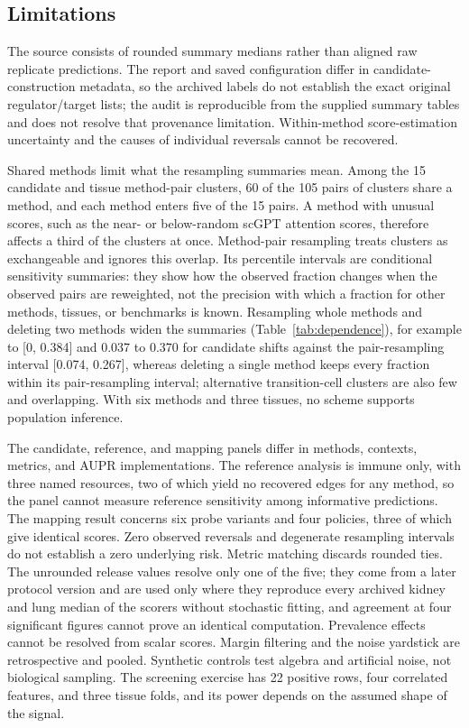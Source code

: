 \documentclass[10pt,letterpaper]{article}
\begin{document}
\subsection*{Limitations}
The source consists of rounded summary medians rather than aligned raw replicate predictions. The report and saved configuration differ in candidate-construction metadata, so the archived labels do not establish the exact original regulator/target lists; the audit is reproducible from the supplied summary tables and does not resolve that provenance limitation. Within-method score-estimation uncertainty and the causes of individual reversals cannot be recovered.

Shared methods limit what the resampling summaries mean. Among the 15 candidate and tissue method-pair clusters, 60 of the 105 pairs of clusters share a method, and each method enters five of the 15 pairs. A method with unusual scores, such as the near- or below-random scGPT attention scores, therefore affects a third of the clusters at once. Method-pair resampling treats clusters as exchangeable and ignores this overlap. Its percentile intervals are conditional sensitivity summaries: they show how the observed fraction changes when the observed pairs are reweighted, not the precision with which a fraction for other methods, tissues, or benchmarks is known. Resampling whole methods and deleting two methods widen the summaries (Table~\ref{tab:dependence}), for example to [0, 0.384] and 0.037 to 0.370 for candidate shifts against the pair-resampling interval [0.074, 0.267], whereas deleting a single method keeps every fraction within its pair-resampling interval; alternative transition-cell clusters are also few and overlapping. With six methods and three tissues, no scheme supports population inference.

The candidate, reference, and mapping panels differ in methods, contexts, metrics, and AUPR implementations. The reference analysis is immune only, with three named resources, two of which yield no recovered edges for any method, so the panel cannot measure reference sensitivity among informative predictions. The mapping result concerns six probe variants and four policies, three of which give identical scores. Zero observed reversals and degenerate resampling intervals do not establish a zero underlying risk. Metric matching discards rounded ties. The unrounded release values resolve only one of the five; they come from a later protocol version and are used only where they reproduce every archived kidney and lung median of the scorers without stochastic fitting, and agreement at four significant figures cannot prove an identical computation. Prevalence effects cannot be resolved from scalar scores. Margin filtering and the noise yardstick are retrospective and pooled. Synthetic controls test algebra and artificial noise, not biological sampling. The screening exercise has 22 positive rows, four correlated features, and three tissue folds, and its power depends on the assumed shape of the signal.
\end{document}

